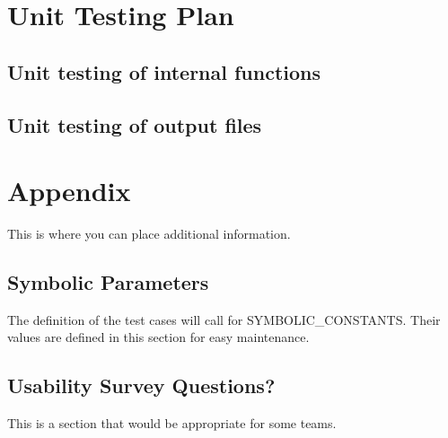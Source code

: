 \documentclass[12pt, titlepage]{article}
\begin{document}
				
\section{Unit Testing Plan}
		
\subsection{Unit testing of internal functions}
		
\subsection{Unit testing of output files}		


\newpage
\section{Appendix}
This is where you can place additional information.
\subsection{Symbolic Parameters}
The definition of the test cases will call for SYMBOLIC\_CONSTANTS.
Their values are defined in this section for easy maintenance.
\subsection{Usability Survey Questions?}
This is a section that would be appropriate for some teams.
\end{document}
